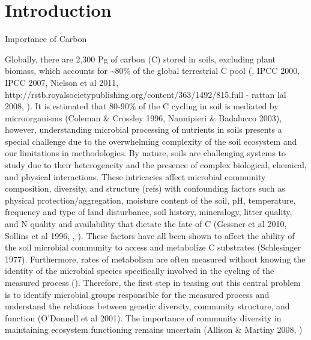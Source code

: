 \section{Introduction} 
Importance of Carbon 

Globally, there are 2,300 Pg of carbon (C) stored in soils, excluding plant biomass, which accounts for \sim80\% of the global terrestrial C pool (\cite{Amundson_2001}, IPCC 2000, IPCC 2007, Nielson et al 2011, http://rstb.royalsocietypublishing.org/content/363/1492/815.full - rattan lal 2008, \cite{BATJES_1996}). It is estimated that 80-90\% of the C cycling in soil is mediated by microorganisms (Coleman & Crossley 1996, Nannipieri & Badalucco 2003), however, understanding microbial processing of nutrients in soils presents a special challenge due to the overwhelming complexity of the soil ecosystem and our limitations in methodologies.  By nature, soils are challenging systems to study due to their heterogeneity and the presence of complex biological, chemical, and physical interactions.  These intricacies affect microbial community composition, diversity, and structure (refs) with confounding factors such as physical protection/aggregation, moisture content of the soil, pH, temperature, frequency and type of land disturbance, soil history, mineralogy, litter quality, and N quality and availability that dictate the fate of C (Gessner et al 2010, Sollins et al 1996, \cite{Torn_Vitousek_Trumbore_2005},  \cite{TRUMBORE_2006}). These factors have all been shown to affect the ability of the soil microbial community to access and metabolize C substrates (Schlesinger 1977). Furthermore, rates of metabolism are often measured without knowing the identity of the microbial species specifically involved in the cycling of the measured process (\cite{ndi_Pietramellara_Renella_2003}).  Therefore, the first step in teasing out this central problem is to identify microbial groups responsible for the measured process and understand the relations between genetic diversity, community structure, and function (O’Donnell et al 2001).  The importance of community diversity in maintaining ecosystem functioning remains uncertain (Allison & Martiny 2008, \cite{ndi_Pietramellara_Renella_2003})


